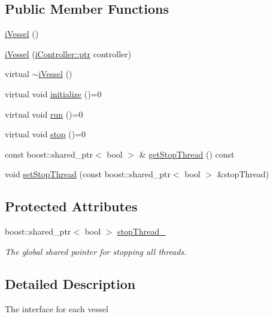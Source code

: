 \subsection*{Public Member Functions}
\begin{DoxyCompactItemize}
\item 
\hyperlink{classo_cpt_1_1i_vessel_a28f9a5ff20f10dc68261b646da3940a5}{i\+Vessel} ()
\item 
\hyperlink{classo_cpt_1_1i_vessel_ac4f486fcfad657f860da2062fef9d7d6}{i\+Vessel} (\hyperlink{classo_cpt_1_1i_controller_a6d89a95cd6ad68bb74adfaca2f36370f}{i\+Controller\+::ptr} controller)
\item 
virtual \hyperlink{classo_cpt_1_1i_vessel_acceefb7d9bffed4f4d8c86fa6808ec23}{$\sim$i\+Vessel} ()
\item 
virtual void \hyperlink{classo_cpt_1_1i_vessel_a866ddfa5330bbb24277de57554a41811}{initialize} ()=0
\item 
virtual void \hyperlink{classo_cpt_1_1i_vessel_a636c138c3d8cb4ddbb2725d36fb12e07}{run} ()=0
\item 
virtual void \hyperlink{classo_cpt_1_1i_vessel_a1cfbb23ae3e73a3587688bf7fbc3f0af}{stop} ()=0
\item 
const boost\+::shared\+\_\+ptr$<$ bool $>$ \& \hyperlink{classo_cpt_1_1i_vessel_aa0c1f81d32a997bb3be3a4edb292b8f9}{get\+Stop\+Thread} () const
\item 
void \hyperlink{classo_cpt_1_1i_vessel_aacfbb96114c16a264b133e2d75c5a083}{set\+Stop\+Thread} (const boost\+::shared\+\_\+ptr$<$ bool $>$ \&stop\+Thread)
\end{DoxyCompactItemize}
\subsection*{Protected Attributes}
\begin{DoxyCompactItemize}
\item 
boost\+::shared\+\_\+ptr$<$ bool $>$ \hyperlink{classo_cpt_1_1i_vessel_a9f52bb65db31b6eea42e29a6213dd78a}{stop\+Thread\+\_\+}
\begin{DoxyCompactList}\small\item\em The global shared pointer for stopping all threads. \end{DoxyCompactList}\end{DoxyCompactItemize}


\subsection{Detailed Description}
The interface for each vessel 

